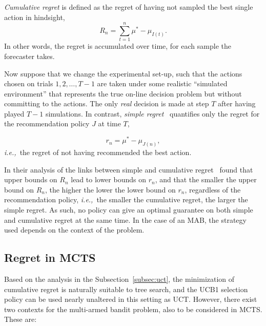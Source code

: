 \documentclass[a4paper]{llncs}
\newcommand{\ie}{{\it i.e.,}~}
\begin{document}
\emph{Cumulative regret} is defined as the regret of having not sampled the best single action in hindsight, 
\begin{equation}
R_n = \sum_{t = 1}^{n}{\mu^* - \mu_{I(t)}}.
\end{equation}
In other words, the regret is accumulated over time, for each sample the forecaster takes.

Now suppose that we change the experimental set-up, such that the actions chosen on trials $1, 2, \ldots, T-1$ are taken under some realistic ``simulated environment'' that represents the true on-line decision problem but without committing to the actions. The only \emph{real} decision is made at step $T$ after having played $T-1$ simulations. In contrast, \emph{simple regret}~\cite{Bubeck11Pure} quantifies only the regret for the recommendation policy $J$ at time $T$,

\begin{equation}
r_n = \mu^* - \mu_{J(n)},
\end{equation}
\ie the regret of not having recommended the best action.

In their analysis of the links between simple and cumulative regret~\cite{Bubeck11Pure} found that upper bounds on $R_n$ lead to lower bounds on $r_n$, and that the smaller the upper bound on $R_n$, the higher the lower the lower bound on $r_n$, regardless of the recommendation policy, \ie the smaller the cumulative regret, the larger the simple regret. As such, no policy can give an optimal guarantee on both simple and cumulative regret at the same time. In the case of an MAB, the strategy used depends on the context of the problem.

\subsection{Regret in MCTS}
\label{subsec:reg_mcts}

Based on the analysis in the Subsection~\ref{subsec:uct}, the minimization of cumulative regret is naturally suitable to tree search, and the UCB1 selection policy can be used nearly unaltered in this setting as UCT. However, there exist two contexts for the multi-armed bandit problem, also to be considered in MCTS. These are:
\end{document}
